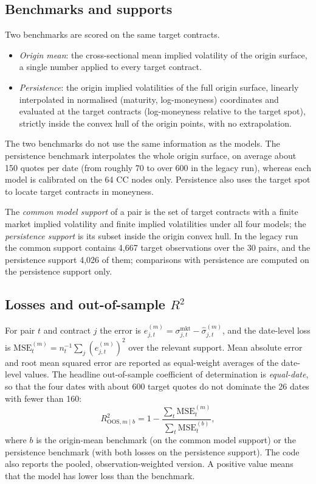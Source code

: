 \subsection{Benchmarks and supports}
\label{subsec:oos_benchmarks}

Two benchmarks are scored on the same target contracts.
\begin{itemize}
    \item \emph{Origin mean}: the cross-sectional mean implied volatility of
    the origin surface, a single number applied to every target contract.
    \item \emph{Persistence}: the origin implied volatilities of the full
    origin surface, linearly interpolated in normalised
    (maturity, log-moneyness) coordinates and evaluated at the target
    contracts (log-moneyness relative to the target spot), strictly inside the
    convex hull of the origin points, with no extrapolation.
\end{itemize}
The two benchmarks do not use the same information as the models.  The
persistence benchmark interpolates the whole origin surface, on average about
150 quotes per date (from roughly 70 to over 600 in the legacy run), whereas
each model is calibrated on the 64 CC nodes only.  Persistence also uses the
target spot to locate target contracts in moneyness.

The \emph{common model support} of a pair is the set of target contracts with
a finite market implied volatility and finite implied volatilities under all
four models; the \emph{persistence support} is its subset inside the origin
convex hull.  In the legacy run the common support contains 4{,}667 target
observations over the 30 pairs, and the persistence support 4{,}026 of them;
comparisons with persistence are computed on the persistence support only.

\subsection{Losses and out-of-sample $R^2$}
\label{subsec:oos_metrics}

For pair $t$ and contract $j$ the error is
$e^{(m)}_{j,t} = \sigma^{\mathrm{mkt}}_{j,t} - \widehat{\sigma}^{(m)}_{j,t}$,
and the date-level loss is
$\mathrm{MSE}^{(m)}_t = n_t^{-1}\sum_{j} \left(e^{(m)}_{j,t}\right)^2$ over the
relevant support.  Mean absolute error and root mean squared error are
reported as equal-weight averages of the date-level values.  The headline
out-of-sample coefficient of determination is \emph{equal-date}, so that the
four dates with about 600 target quotes do not dominate the 26 dates with
fewer than 160:
\begin{equation}
    R^2_{\mathrm{OOS},m\mid b}
    =
    1 -
    \frac{\sum_{t} \mathrm{MSE}^{(m)}_t}{\sum_{t} \mathrm{MSE}^{(b)}_t},
\end{equation}
where $b$ is the origin-mean benchmark (on the common model support) or the
persistence benchmark (with both losses on the persistence support).  The code
also reports the pooled, observation-weighted version.  A positive value means
that the model has lower loss than the benchmark.


